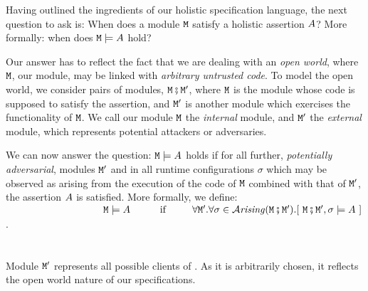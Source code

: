 
Having outlined the ingredients of our holistic specification
language, the next question to ask is: When does a module ${\mbox{\tt{\ensuremath{{\mbox{\tt{M}}}}}}}$ satisfy
a holistic assertion $A$?  More formally: when does
${\mbox{\tt{\ensuremath{{\mbox{\tt{M}}}}}}} \models A$ 
hold? 
  
Our answer has to reflect the fact that we are dealing with an  
\emph{open  world},  where  ${\mbox{\tt{\ensuremath{{\mbox{\tt{M}}}}}}}$, our module, may be
linked with \textit{arbitrary untrusted code}.
%
%
%
%
To %
 model the open world, we consider
 pairs of modules, 
${\mbox{\tt{\ensuremath{{\mbox{\tt{M}}}}}}} \fatsemi {{\mbox{\tt{\ensuremath{{\mbox{\tt{M}}}}}}}'}$,  where ${\mbox{\tt{\ensuremath{{\mbox{\tt{M}}}}}}}$ is the module 
whose code is supposed to satisfy the assertion,
and ${\mbox{\tt{\ensuremath{{\mbox{\tt{M}}}}}}}'$  is  another %
 module which exercises
the functionality of ${\mbox{\tt{\ensuremath{{\mbox{\tt{M}}}}}}}$. We call our module ${\mbox{\tt{\ensuremath{{\mbox{\tt{M}}}}}}}$ the {\em internal} module, and
 ${\mbox{\tt{\ensuremath{{\mbox{\tt{M}}}}}}}'$ the {\em external} module, which represents potential
 attackers or adversaries.
     
We can now answer the question: ${\mbox{\tt{\ensuremath{{\mbox{\tt{M}}}}}}} \models A$ 
 holds if for all further, {\em potentially adversarial}, modules ${\mbox{\tt{\ensuremath{{\mbox{\tt{M}}}}}}}'$ and in  all runtime configurations $\sigma$ which may be observed as arising from the  execution of the code of ${\mbox{\tt{\ensuremath{{\mbox{\tt{M}}}}}}}$ combined with that of ${\mbox{\tt{\ensuremath{{\mbox{\tt{M}}}}}}}'$, the assertion $A$ is satisfied. More formally, we define:\\
$~ \strut  \hspace{1.3in} \M \models \A \ \ \  \ \ \ \ \ \mbox{
if               } \ \ \  \ \ \  \  \forall \M'.\forall \sigma\in\Arising
{\M \mkpair  {\M'}}. [\ \M \mkpair  {\M'},\sigma \models \A\ ]$.  \\
\\
 \\
Module ${\mbox{\tt{\ensuremath{{\mbox{\tt{M}}}}}}}'$ represents all possible clients of {\M}.  As it is arbitrarily chosen, it reflects the open world nature of our specifications.%

